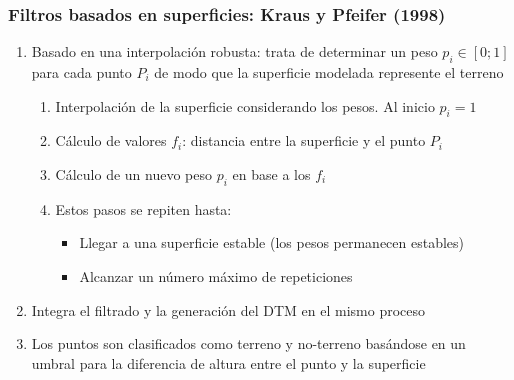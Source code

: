 \begin{frame}
  \frametitle{Filtros basados en superficies: Kraus y Pfeifer (1998)}
  \begin{enumerate}
    \item Basado en una \alert{interpolación robusta}: trata de determinar un peso 
      $p_i \in [0;1]$ para cada punto $P_i$ de modo que la superficie 
      modelada represente el terreno
      \begin{enumerate}
        \item<2-> Interpolación de la superficie considerando los pesos. Al inicio
          $p_i = 1$
        \item<3-> Cálculo de valores $f_i$: distancia entre la superficie y el punto
          $P_i$
        \item<4-> Cálculo de un nuevo peso $p_i$ en base a los $f_i$
        \item<5-> Estos pasos se repiten hasta:
          \begin{itemize}
            \item<5-> Llegar a una superficie estable (los pesos permanecen estables)
            \item<5-> Alcanzar un número máximo de repeticiones
          \end{itemize}
      \end{enumerate}
    \item<6-> Integra el filtrado y la generación del DTM en el mismo proceso
    \item<6-> Los puntos son clasificados como terreno y no-terreno basándose en un
      umbral para la diferencia de altura entre el punto y la superficie
  \end{enumerate}
\end{frame}

